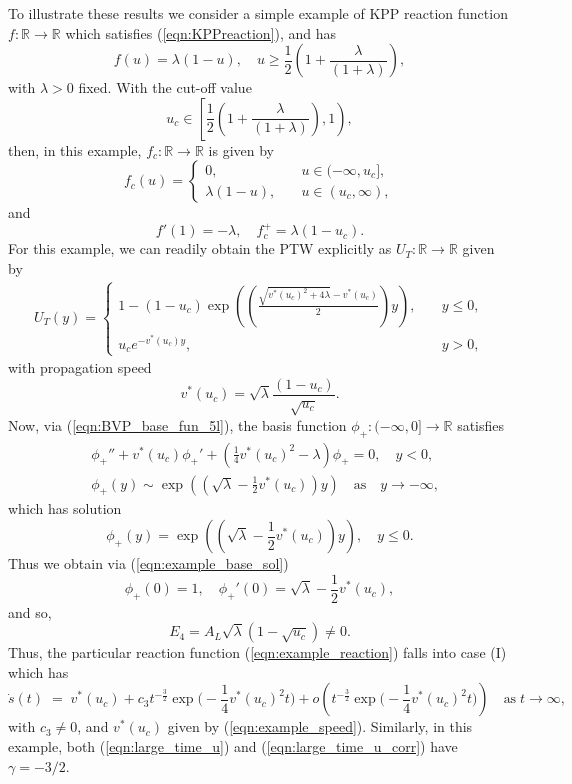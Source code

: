 \documentclass[11pt,a4paper]{article}
\newcommand{\eeref}[1]{(\ref{eqn:#1})}
\newcommand{\eelab}[1]{\label{eqn:#1}}
\def\beq{\begin{equation}}
\def\eeq{\end{equation}}
\begin{document}
To illustrate these results we consider a simple example of KPP reaction function $f: \mathbb{R} \to \mathbb{R}$ which satisfies \eeref{KPPreaction}, and has 
\beq
f(u) = \lambda (1-u), \quad u \geq \frac{1}{2} \left( 1 + \frac{\lambda}{(1 + \lambda)}   \right),
\eeq
with $\lambda > 0$ fixed. With the cut-off value 
\beq \eelab{example_uc}
u_c \in \left. \left[ \frac{1}{2} \left( 1 + \frac{ \lambda}{ ( 1 + \lambda) }    \right), 1 \right) \right. ,
\eeq
then, in this example, $f_c : \mathbb{R} \to \mathbb{R}$ is given by
\beq \eelab{example_reaction}
f_c(u) = \begin{cases}  0, \quad & u \in (- \infty, u_c] ,     \\
 \lambda(1-u), \quad &  u \in (u_c, \infty),  \end{cases}  
\eeq
and
\beq
f'(1) = - \lambda, \quad f_c^+ = \lambda ( 1 - u_c ).
\eeq
For this example, we can readily obtain the PTW explicitly as $U_T: \mathbb{R} \to \mathbb{R}$ given by
 \begin{align} \eelab{example_sol}
U_T(y) = \begin{cases}  1 - (1-u_c) \exp { \left(  \left( \frac{ \sqrt{ v^*(u_c)^2 + 4 \lambda } -v^*(u_c)}{2}            \right) y    \right) }, \quad & y \leq 0,     \\
 u_c e^{ - v^*(u_c) y} , \quad & y > 0,  \end{cases}  
\end{align}
with propagation speed
\beq \eelab{example_speed}
v^*(u_c) = \sqrt{  \lambda}  \frac{ ( 1 - u_c)}{\sqrt{u_c}}. 
\eeq
Now, via \eeref{BVP_base_fun_5l}, the basis function $\phi_+ : (-\infty, 0] \to \mathbb{R}$ satisfies 
\begin{subequations} \eelab{example_BVP_base_fun}
 \begin{align}
& \phi_+'' + v^*(u_c) \phi_+' + \left( \frac{1}{4}v^*(u_c)^2 - \lambda \right) \phi_+ = 0, \quad y < 0 , \eelab{example_BVP_base_fun_1}  \\
& \phi_+(y) \sim \exp \left( \left( \sqrt{ \lambda } - \frac{1}{2} v^*(u_c) \right) y \right) \quad \mbox{as} \quad y \to - \infty ,\eelab{example_BVP_base_fun_2} 
\end{align}
\end{subequations}
which has solution 
\beq \eelab{example_base_sol}
\phi_+(y) = \exp \left( \left( \sqrt{ \lambda } - \frac{1}{2} v^*(u_c) \right) y \right), \quad y \leq 0 . 
\eeq
Thus we obtain via \eeref{example_base_sol}
\beq
\phi_+(0) =1, \quad \phi_+'(0)=  \sqrt{ \lambda } - \frac{1}{2} v^*(u_c),
\eeq
and so,
\beq
E_4 = A_L \sqrt{ \lambda } \left( 1 - \sqrt{u_c} \right) \neq 0 .
\eeq
Thus, the particular reaction function \eeref{example_reaction} falls into case (I) which has 
\beq
\dot{s}(t) \;= \; v^*(u_c) + c_3 t^{-\frac{3}{2}}  \exp {  \bigg( - \frac{1}{4}  v^*(u_c)^2 t \bigg) }   + o \left( t^{- \frac{3}{2}}  \exp {  \bigg( - \frac{1}{4}  v^*(u_c)^2 t \bigg) }  \right) \quad \mbox{as} \; t \to \infty,  \eelab{example_large_time_speed}
\eeq
with $c_3 \neq 0$, and $v^*(u_c)$ given by \eeref{example_speed}. Similarly, in this example, both \eeref{large_time_u} and \eeref{large_time_u_corr} have $\gamma = - 3/2$.
\end{document}
